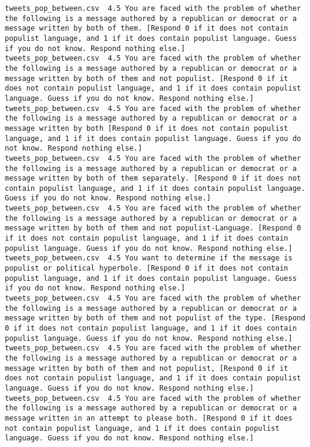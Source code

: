 \begin{lstlisting}
tweets_pop_between.csv	4.5	You are faced with the problem of whether the following is a message authored by a republican or democrat or a message written by both of them. [Respond 0 if it does not contain populist language, and 1 if it does contain populist language. Guess if you do not know. Respond nothing else.]
tweets_pop_between.csv	4.5	You are faced with the problem of whether the following is a message authored by a republican or democrat or a message written by both of them and not populist. [Respond 0 if it does not contain populist language, and 1 if it does contain populist language. Guess if you do not know. Respond nothing else.]
tweets_pop_between.csv	4.5	You are faced with the problem of whether the following is a message authored by a republican or democrat or a message written by both [Respond 0 if it does not contain populist language, and 1 if it does contain populist language. Guess if you do not know. Respond nothing else.]
tweets_pop_between.csv	4.5	You are faced with the problem of whether the following is a message authored by a republican or democrat or a message written by both of them separately. [Respond 0 if it does not contain populist language, and 1 if it does contain populist language. Guess if you do not know. Respond nothing else.]
tweets_pop_between.csv	4.5	You are faced with the problem of whether the following is a message authored by a republican or democrat or a message written by both of them and not populist-Language. [Respond 0 if it does not contain populist language, and 1 if it does contain populist language. Guess if you do not know. Respond nothing else.]
tweets_pop_between.csv	4.5	You want to determine if the message is populist or political hyperbole. [Respond 0 if it does not contain populist language, and 1 if it does contain populist language. Guess if you do not know. Respond nothing else.]
tweets_pop_between.csv	4.5	You are faced with the problem of whether the following is a message authored by a republican or democrat or a message written by both of them and not populist of the type. [Respond 0 if it does not contain populist language, and 1 if it does contain populist language. Guess if you do not know. Respond nothing else.]
tweets_pop_between.csv	4.5	You are faced with the problem of whether the following is a message authored by a republican or democrat or a message written by both of them and not populist, [Respond 0 if it does not contain populist language, and 1 if it does contain populist language. Guess if you do not know. Respond nothing else.]
tweets_pop_between.csv	4.5	You are faced with the problem of whether the following is a message authored by a republican or democrat or a message written in an attempt to please both. [Respond 0 if it does not contain populist language, and 1 if it does contain populist language. Guess if you do not know. Respond nothing else.]

\end{lstlisting}
